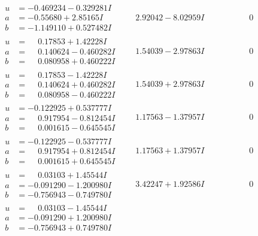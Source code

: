 \documentclass[1p]{elsarticle_modified}
\theoremstyle{definition}
\begin{document}
$$\begin{array}{c|c|c}
\begin{aligned}
u &= -0.469234 - 0.329281 I \\
a &= -0.55680 + 2.85165 I \\
b &= -1.149110 + 0.527482 I\end{aligned}
 & \phantom{-}2.92042 - 8.02959 I & \phantom{-0.000000 } 0 \\ \hline\begin{aligned}
u &= \phantom{-}0.17853 + 1.42228 I \\
a &= \phantom{-}0.140624 - 0.460282 I \\
b &= \phantom{-}0.080958 + 0.460222 I\end{aligned}
 & \phantom{-}1.54039 - 2.97863 I & \phantom{-0.000000 } 0 \\ \hline\begin{aligned}
u &= \phantom{-}0.17853 - 1.42228 I \\
a &= \phantom{-}0.140624 + 0.460282 I \\
b &= \phantom{-}0.080958 - 0.460222 I\end{aligned}
 & \phantom{-}1.54039 + 2.97863 I & \phantom{-0.000000 } 0 \\ \hline\begin{aligned}
u &= -0.122925 + 0.537777 I \\
a &= \phantom{-}0.917954 - 0.812454 I \\
b &= \phantom{-}0.001615 - 0.645545 I\end{aligned}
 & \phantom{-}1.17563 - 1.37957 I & \phantom{-0.000000 } 0 \\ \hline\begin{aligned}
u &= -0.122925 - 0.537777 I \\
a &= \phantom{-}0.917954 + 0.812454 I \\
b &= \phantom{-}0.001615 + 0.645545 I\end{aligned}
 & \phantom{-}1.17563 + 1.37957 I & \phantom{-0.000000 } 0 \\ \hline\begin{aligned}
u &= \phantom{-}0.03103 + 1.45544 I \\
a &= -0.091290 - 1.200980 I \\
b &= -0.756943 - 0.749780 I\end{aligned}
 & \phantom{-}3.42247 + 1.92586 I & \phantom{-0.000000 } 0 \\ \hline\begin{aligned}
u &= \phantom{-}0.03103 - 1.45544 I \\
a &= -0.091290 + 1.200980 I \\
b &= -0.756943 + 0.749780 I\end{aligned}

\end{array}$$
\end{document}
